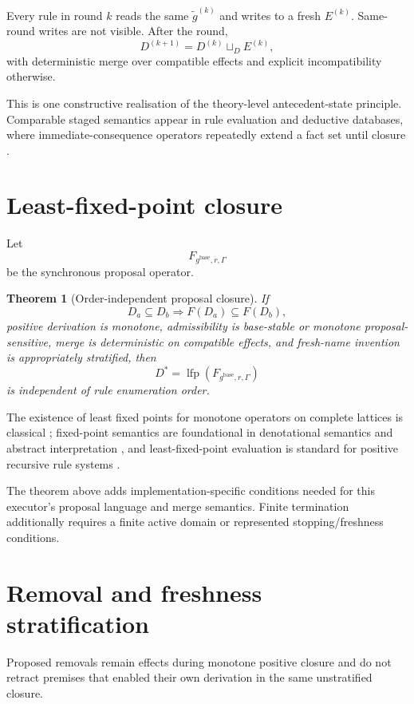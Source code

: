 \documentclass[11pt,a4paper]{article}
\newtheorem{theorem}{Theorem}[section]
\theoremstyle{remark}
\begin{document}
Every rule in round $k$ reads the same $\widetilde g^{(k)}$ and writes to a fresh $E^{(k)}$. Same-round writes are not visible. After the round,
\[
D^{(k+1)}
=
D^{(k)}\sqcup_D E^{(k)},
\]
with deterministic merge over compatible effects and explicit incompatibility otherwise.

This is one constructive realisation of the theory-level antecedent-state principle. Comparable staged semantics appear in rule evaluation and deductive databases, where immediate-consequence operators repeatedly extend a fact set until closure \citep{ceri1989}.

\section{Least-fixed-point closure}\label{sec:lfp}

Let
\[
F_{g^{\mathrm{base}},r,\Gamma}
\]
be the synchronous proposal operator.

\begin{theorem}[Order-independent proposal closure]\label{thm:lfp}
If
\[
D_a\subseteq D_b
\Rightarrow
F(D_a)\subseteq F(D_b),
\]
positive derivation is monotone, admissibility is base-stable or monotone proposal-sensitive, merge is deterministic on compatible effects, and fresh-name invention is appropriately stratified, then
\[
\boxed{
D^*
=
\operatorname{lfp}
\left(
F_{g^{\mathrm{base}},r,\Gamma}
\right)
}
\]
is independent of rule enumeration order.
\end{theorem}

The existence of least fixed points for monotone operators on complete lattices is classical \citep{tarski1955}; fixed-point semantics are foundational in denotational semantics and abstract interpretation \citep{cousot1977}, and least-fixed-point evaluation is standard for positive recursive rule systems \citep{ceri1989}.

The theorem above adds implementation-specific conditions needed for this executor's proposal language and merge semantics. Finite termination additionally requires a finite active domain or represented stopping/freshness conditions.

\section{Removal and freshness stratification}\label{sec:stratification}

Proposed removals remain effects during monotone positive closure and do not retract premises that enabled their own derivation in the same unstratified closure.
\end{document}
